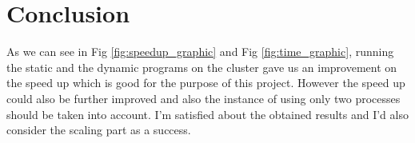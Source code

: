 \documentclass[11pt,conference]{IEEEtran}
\begin{document}
\section{Conclusion}
As we can see in Fig \ref{fig:speedup_graphic} and Fig \ref{fig:time_graphic}, running the static and the dynamic programs on the cluster gave us an improvement on the speed up which is good for the purpose of this project.
\newline
However the speed up could also be further improved and also the instance of using only two processes should be taken into account.
I'm satisfied about the obtained results and I'd also consider the scaling part as a success.




\end{document}
